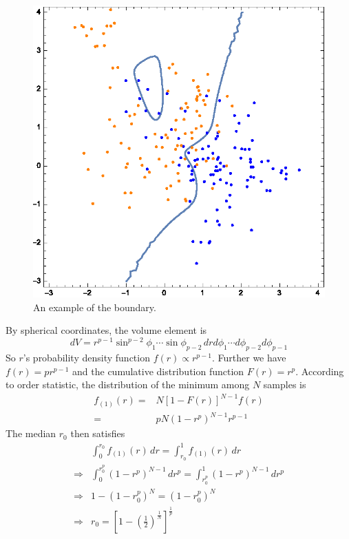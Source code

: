 \begin{sol}
\begin{figure}
	\centering
	\includegraphics[width=\textwidth]{figures/2_2.eps}
	\caption{An example of the boundary.}
	\label{fig:2-2}
\end{figure}

\end{sol}

\begin{sol}
By spherical coordinates, the volume element is \[
dV=r^{p-1}\sin^{p-2}\phi_1\cdots\sin\phi_{p-2}\,drd\phi_1\cdots d\phi_{p-2}d\phi_{p-1}
\]
So $r$'s probability density function $f(r)\propto r^{p-1}$. Further we have $f(r)=pr^{p-1}$ and the cumulative distribution function $F(r)=r^p$. According to order statistic, the distribution of the minimum among $N$ samples is
\begin{align*}
f_{(1)}(r) =& N\left[1-F(r)\right]^{N-1}f(r)\\
=& pN\left(1-r^p\right)^{N-1}r^{p-1}
\end{align*}
The median $r_0$ then satisfies
\begin{align*}
& \int_0^{r_0}f_{(1)}(r)\,dr=\int_{r_0}^1f_{(1)}(r)\,dr \\
\Longrightarrow & \int_0^{r_0^p}\left(1-r^p\right)^{N-1}\,dr^p=\int_{r_0^p}^1\left(1-r^p\right)^{N-1}\,dr^p \\
\Longrightarrow & 1-\left(1-r_0^p\right)^N=\left(1-r_0^p\right)^N \\
\Longrightarrow & r_0=\left[1-\left(\frac{1}{2}\right)^{\frac{1}{N}}\right]^{\frac{1}{p}}
\end{align*}
\end{sol}

